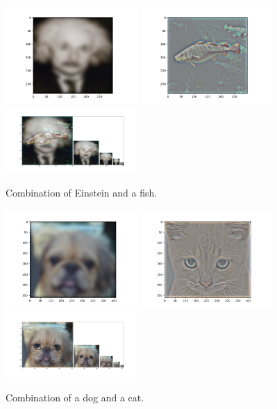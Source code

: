 \begin{enumerate}
    \begin{figure}[h]
        \centering
        \includegraphics[width=5cm]{lowpassEin.png}
        \includegraphics[width=5cm]{highpassFish.png}
        \includegraphics[width=5cm]{fishStein.png}
        \caption{Combination of Einstein and a fish.}
        \label{fig:result2}
    \end{figure}

    \begin{figure}[h]
        \centering
        \includegraphics[width=5cm]{lowpassDog.png}
        \includegraphics[width=5cm]{highpassCat.png}
        \includegraphics[width=5cm]{catDog.png}
        \caption{Combination of a dog and a cat.}
        \label{fig:result3}
    \end{figure}

\end{enumerate}


